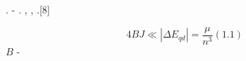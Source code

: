 \documentclass[a4paper]{article}
\begin{document}
{\CYRS}{\cyrr}{\cyra}{\cyrz}{\cyru} {\cyrp}{\cyro}{\cyrg}{\cyro}{\cyrv}{\cyro}{\cyrr}{\cyri}{\cyrm} {\cyro}
{\cyrg}{\cyrr}{\cyra}{\cyrn}{\cyri}{\cyrc}{\cyra}{\cyrh}
{\cyrp}{\cyrr}{\cyri}{\cyrm}{\cyre}{\cyrn}{\cyri}{\cyrm}{\cyro}{\cyrs}{\cyrt}{\cyri}
{\cyrt}{\cyra}{\cyrk}{\cyro}{\cyrg}{\cyro}
{\cyrp}{\cyrr}{\cyri}{\cyrb}{\cyrl}{\cyri}{\cyrzh}{\cyre}{\cyrn}{\cyri}{\cyrya}. {\CYRV}
{\cyrp}{\cyrr}{\cyrya}{\cyrm}{\cyro}{\cyrm}
{\cyrp}{\cyrr}{\cyri}{\cyrb}{\cyrl}{\cyri}{\cyrzh}{\cyre}{\cyrn}{\cyri}{\cyri}
{\CYRB}{\cyro}{\cyrr}{\cyrn}{\cyra}-{\CYRO}{\cyrp}{\cyrp}{\cyre}{\cyrn}{\cyrg}{\cyre}{\cyrishrt}{\cyrm}{\cyre}{\cyrr}{\cyra}
{\cyrm}{\cyro}{\cyrm}{\cyre}{\cyrn}{\cyrt} {\cyri}{\cyrm}{\cyrp}{\cyru}{\cyrl}{\cyrsftsn}{\cyrs}{\cyra}
{\cyrr}{\cyri}{\cyrd}{\cyrb}{\cyre}{\cyrr}{\cyrg}{\cyro}{\cyrv}{\cyrs}{\cyrk}{\cyro}{\cyrg}{\cyro}
{\cyrerev}{\cyrl}{\cyre}{\cyrk}{\cyrt}{\cyrr}{\cyro}{\cyrn}{\cyra} {\cyrs}{\cyri}{\cyrl}{\cyrsftsn}{\cyrn}{\cyro}
{\cyrs}{\cyrv}{\cyrya}{\cyrz}{\cyra}{\cyrn} {\cyrs} {\cyro}{\cyrs}{\cyrsftsn}{\cyryu}
{\cyrs}{\cyri}{\cyrm}{\cyrm}{\cyre}{\cyrt}{\cyrr}{\cyri}{\cyri} {\cyro}{\cyrs}{\cyrt}{\cyro}{\cyrv}{\cyra}.
{\CYREREV}{\cyrt}{\cyro} {\cyri}{\cyrm}{\cyre}{\cyre}{\cyrt} {\cyrm}{\cyre}{\cyrs}{\cyrt}{\cyro},
{\cyrk}{\cyro}{\cyrg}{\cyrd}{\cyra} {\cyrp}{\cyrr}{\cyre}{\cyrc}{\cyre}{\cyrs}{\cyrs}{\cyri}{\cyrya}
{\cyro}{\cyrr}{\cyrb}{\cyri}{\cyrt}{\cyrery}
{\cyrr}{\cyri}{\cyrd}{\cyrb}{\cyre}{\cyrr}{\cyrg}{\cyro}{\cyrv}{\cyrs}{\cyrk}{\cyro}{\cyrg}{\cyro}
{\cyrerev}{\cyrl}{\cyre}{\cyrk}{\cyrt}{\cyrr}{\cyro}{\cyrn}{\cyra} {\cyri}{\cyrm}{\cyre}{\cyre}{\cyrt}
{\cyrb}{\cyro}{\cyrl}{\cyre}{\cyre} {\cyrv}{\cyrery}{\cyrs}{\cyro}{\cyrk}{\cyru}{\cyryu}
{\cyrch}{\cyra}{\cyrs}{\cyrt}{\cyro}{\cyrt}{\cyru}, {\cyrch}{\cyre}{\cyrm}
{\cyrv}{\cyrr}{\cyra}{\cyrshch}{\cyre}{\cyrn}{\cyri}{\cyre} {\cyrm}{\cyro}{\cyrl}{\cyre}{\cyrk}{\cyru}{\cyrl}{\cyrery}
{\cyrv} {\cyrc}{\cyre}{\cyrl}{\cyro}{\cyrm}.[8]

\begin{equation*}
4\mathit{BJ}{\ll}\left|{\Delta}E_{\mathit{qd}}\right|=\frac{\mu }{n^3}(1.1)
\end{equation*}
{\CYRZ}{\cyrd}{\cyre}{\cyrs}{\cyrsftsn}  $B$ -
{\cyrv}{\cyrr}{\cyra}{\cyrshch}{\cyra}{\cyrt}{\cyre}{\cyrl}{\cyrsftsn}{\cyrn}{\cyra}{\cyrya}
{\cyrk}{\cyro}{\cyrn}{\cyrs}{\cyrt}{\cyra}{\cyrn}{\cyrt}{\cyra} {\cyrv}
{\cyro}{\cyrp}{\cyre}{\cyrr}{\cyra}{\cyrt}{\cyro}{\cyrr}{\cyre}
{\cyrc}{\cyre}{\cyrn}{\cyrt}{\cyrr}{\cyro}{\cyrb}{\cyre}{\cyrzh}{\cyrn}{\cyro}{\cyrishrt}
{\cyrerev}{\cyrn}{\cyre}{\cyrr}{\cyrg}{\cyri}{\cyri} {\cyrya}{\cyrd}{\cyre}{\cyrr}
\end{document}
